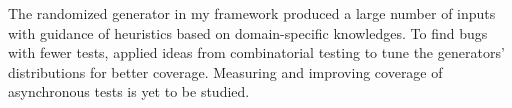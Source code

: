 The randomized generator in my framework produced a large number of inputs with
guidance of heuristics based on domain-specific knowledges.  To find bugs with
fewer tests, \citet{judge-cover} applied ideas from combinatorial testing to
tune the generators' distributions for better coverage.  Measuring and improving
coverage of asynchronous tests is yet to be studied.
